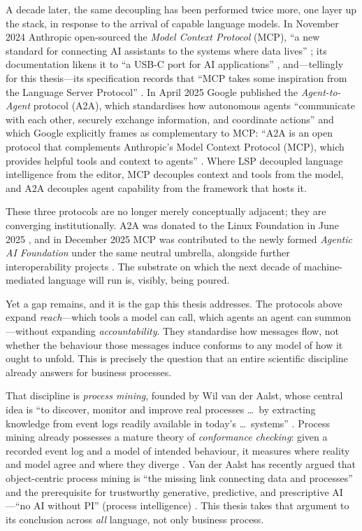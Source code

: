 A decade later, the same decoupling has been performed twice more, one layer up
the stack, in response to the arrival of capable language models. In November
2024 Anthropic open-sourced the \emph{Model Context Protocol} (MCP), ``a new
standard for connecting AI assistants to the systems where data lives''
\citep{mcp-anthropic-2024}; its documentation likens it to ``a USB-C port for AI
applications'' \citep{mcp-intro}, and---tellingly for this thesis---its
specification records that ``MCP takes some inspiration from the Language Server
Protocol'' \citep{mcp-spec-2025}. In April 2025 Google published the
\emph{Agent-to-Agent} protocol (A2A), which standardises how autonomous agents
``communicate with each other, securely exchange information, and coordinate
actions'' and which Google explicitly frames as complementary to MCP: ``A2A is an
open protocol that complements Anthropic's Model Context Protocol (MCP), which
provides helpful tools and context to agents'' \citep{a2a-google-2025}. Where LSP
decoupled language intelligence from the editor, MCP decouples context and tools
from the model, and A2A decouples agent capability from the framework that hosts
it.

These three protocols are no longer merely conceptually adjacent; they are
converging institutionally. A2A was donated to the Linux Foundation in June 2025
\citep{a2a-lf-donation,lf-a2a-press}, and in December 2025 MCP was contributed to
the newly formed \emph{Agentic AI Foundation} under the same neutral umbrella,
alongside further interoperability projects \citep{mcp-aaif-2025,lf-aaif-press}.
The substrate on which the next decade of machine-mediated language will run is,
visibly, being poured.

Yet a gap remains, and it is the gap this thesis addresses. The protocols above
expand \emph{reach}---which tools a model can call, which agents an agent can
summon---without expanding \emph{accountability}. They standardise how messages
flow, not whether the behaviour those messages induce conforms to any model of
how it ought to unfold. This is precisely the question that an entire scientific
discipline already answers for business processes.

That discipline is \emph{process mining}, founded by Wil van der Aalst, whose
central idea is ``to discover, monitor and improve real processes \dots\ by
extracting knowledge from event logs readily available in today's
\dots\ systems'' \citep{pm-manifesto-2011,vdaalst-book-2016}. Process mining
already possesses a mature theory of \emph{conformance checking}: given a
recorded event log and a model of intended behaviour, it measures where reality
and model agree and where they diverge \citep{conformance-review-2020}. Van der
Aalst has recently argued that object-centric process mining is ``the missing
link connecting data and processes'' and the prerequisite for trustworthy
generative, predictive, and prescriptive AI---``no AI without PI'' (process
intelligence) \citep{noai-nopi-2025}. This thesis takes that argument to its
conclusion across \emph{all} language, not only business process.


